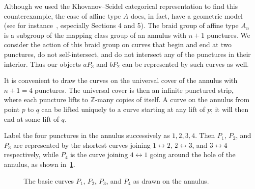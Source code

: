 \documentclass[a4paper]{amsart}
\newcommand{\0}{\mathbf{0}}
\theoremstyle{theorem}
\begin{document}
Although we used the Khovanov--Seidel categorical representation to find this counterexample, the case of affine type \(A\) does, in fact, have a geometric model (see for instance~\cite{GTW}, especially Sections 4 and 5).
The braid group of affine type \(A_n\) is a subgroup of the mapping class group of an annulus with \(n+1\) punctures.
We consider the action of this braid group on curves that begin and end at two punctures, do not self-intersect, and do not intersect any of the punctures in their interior.
Thus our objects \(aP_3\) and \(bP_2\) can be represented by such curves as well.

It is convenient to draw the curves on the universal cover of the annulus with \(n+1 = 4\) punctures.
The universal cover is then an infinite punctured strip, where each puncture lifts to \(\mathbb{Z}\)-many copies of itself.
A curve on the annulus from point \(p\) to \(q\) can be lifted uniquely to a curve starting at any lift of \(p\); it will then end at some lift of \(q\).

Label the four punctures in the annulus successively as \(1,2,3,4\).
Then \(P_1\), \(P_2\), and \(P_3\) are represented by the shortest curves joining \(1 \leftrightarrow 2\), \(2 \leftrightarrow 3\), and \(3 \leftrightarrow 4\) respectively, while \(P_4\) is the curve joining \(4 \leftrightarrow 1\) going around the hole of the annulus, as shown in~\cref{fig:curves-on-annulus}.
\begin{figure}[ht]
  \centering
  \caption[Basic curves on the annulus]{The basic curves \(P_1\), \(P_2\), \(P_3\), and \(P_4\) as drawn on the annulus.}
  \label{fig:curves-on-annulus}
\end{figure}
\end{document}
